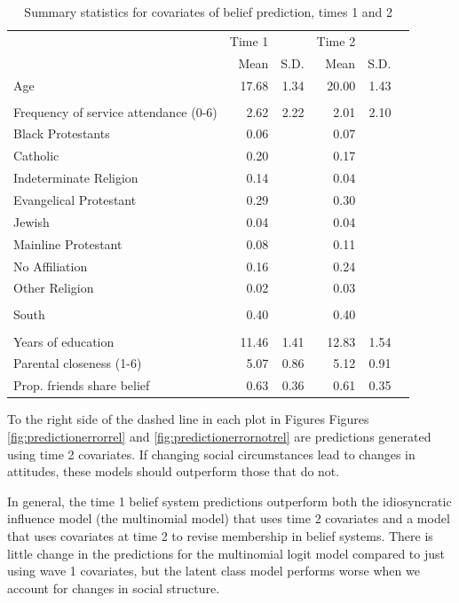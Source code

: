 \documentclass[12pt,]{article}
\begin{document}
\begin{table}
\begin{center}
\begin{tabular}{l r r r r r}
\hline
  & Time 1 &  & Time 2 & \\
  & Mean & S.D. & Mean & S.D.\\
\hline
Age & 17.68 & 1.34 & 20.00 & 1.43\\
\\
Frequency of service attendance (0-6) & 2.62 & 2.22 & 2.01 & 2.10\\
Black Protestants & 0.06 &  & 0.07 & \\
Catholic & 0.20 & & 0.17 & \\
Indeterminate Religion & 0.14 &  & 0.04 & \\
Evangelical Protestant & 0.29 &  & 0.30 & \\
Jewish & 0.04 &  & 0.04 & \\
Mainline Protestant & 0.08 &  & 0.11 & \\
No Affiliation & 0.16 &  & 0.24 & \\
Other Religion & 0.02 &  & 0.03 & \\
\\
South & 0.40 & & 0.40 & \\
\\
Years of education & 11.46 & 1.41 & 12.83 & 1.54\\
Parental closeness (1-6) & 5.07 & 0.86 & 5.12 & 0.91\\
Prop. friends share belief & 0.63 & 0.36 & 0.61 & 0.35\\
\hline
\end{tabular}
\caption{Summary statistics for covariates of belief prediction, times 1 and 2}
\label{table:covsum}
\end{center}
\end{table}

To the right side of the dashed line in each plot in Figures Figures \ref{fig:predictionerrorrel} and \ref{fig:predictionerrornotrel} are predictions generated using time 2 covariates. If changing social circumstances lead to changes in attitudes, these models should outperform those that do not.

In general, the time 1 belief system predictions outperform both the idiosyncratic influence model (the multinomial model) that uses time 2 covariates and a model that uses covariates at time 2 to revise membership in belief systems. There is little change in the predictions for the multinomial logit model compared to just using wave 1 covariates, but the latent class model performs worse when we account for changes in social structure.
\end{document}
